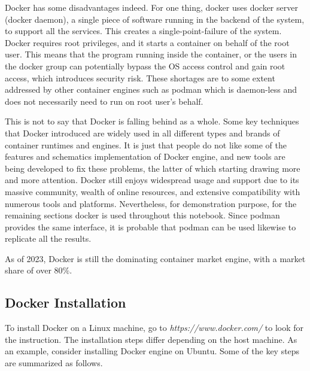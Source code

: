 Docker has some disadvantages indeed. For one thing, docker uses docker server (docker daemon), a single piece of software running in the backend of the system, to support all the services. This creates a single-point-failure of the system. Docker requires root privileges, and it starts a container on behalf of the root user. This means that the program running inside the container, or the users in the docker group can potentially bypass the OS access control and gain root access, which introduces security risk. These shortages are to some extent addressed by other container engines such as podman which is daemon-less and does not necessarily need to run on root user's behalf.

This is not to say that Docker is falling behind as a whole. Some key techniques that Docker introduced are widely used in all different types and brands of container runtimes and engines. It is just that people do not like some of the features and schematics implementation of Docker engine, and new tools are being developed to fix these problems, the latter of which starting drawing more and more attention. Docker still enjoys widespread usage and support due to its massive community, wealth of online resources, and extensive compatibility with numerous tools and platforms. Nevertheless, for demonstration purpose, for the remaining sections docker is used throughout this notebook. Since podman provides the same interface, it is probable that podman can be used likewise to replicate all the results.

As of 2023, Docker is still the dominating container market engine, with a market share of over $80\%$.

\subsection{Docker Installation}

To install Docker on a Linux machine, go to \textit{https://www.docker.com/} to look for the instruction. The installation steps differ depending on the host machine. As an example, consider installing Docker engine on Ubuntu. Some of the key steps are summarized as follows.

